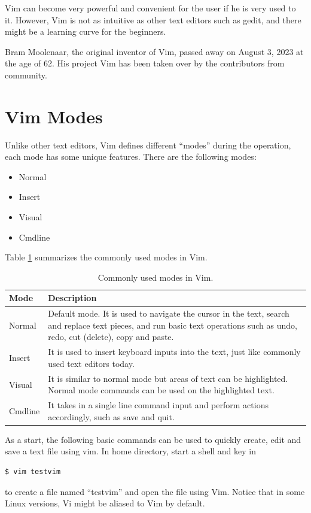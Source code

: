 Vim can become very powerful and convenient for the user if he is very used to it. However, Vim is not as intuitive as other text editors such as gedit, and there might be a learning curve for the beginners.

Bram Moolenaar, the original inventor of Vim, passed away on August 3, 2023 at the age of 62. His project Vim has been taken over by the contributors from community. 

\section{Vim Modes} \label{ch:tfe:subsec:vimgeneralintro}

Unlike other text editors, Vim defines different ``modes'' during the operation, each mode has some unique features. There are the following modes:
\begin{itemize}
  \item Normal
  \item Insert
  \item Visual
  \item Cmdline
\end{itemize}
Table \ref{ch:tfe:tab:vimmodes} summarizes the commonly used modes in Vim.
\begin{table}
  \centering \caption{Commonly used modes in Vim.}\label{ch:tfe:tab:vimmodes}
  \begin{tabularx}{\textwidth}{lX}
    \hline
    Mode & Description \\ \hline
    Normal & Default mode. It is used to navigate the cursor in the text, search and replace text pieces, and run basic text operations such as undo, redo, cut (delete), copy and paste. \\ 
    Insert & It is used to insert keyboard inputs into the text, just like commonly used text editors today. \\ 
    Visual & It is similar to normal mode but areas of text can be highlighted. Normal mode commands can be used on the highlighted text. \\ 
    Cmdline & It takes in a single line command input and perform actions accordingly, such as save and quit. \\
    \hline
  \end{tabularx}
\end{table}

As a start, the following basic commands can be used to quickly create, edit and save a text file using vim. In home directory, start a shell and key in
\begin{lstlisting}
$ vim testvim
\end{lstlisting}
to create a file named ``testvim'' and open the file using Vim. Notice that in some Linux versions, Vi might be aliased to Vim by default.

